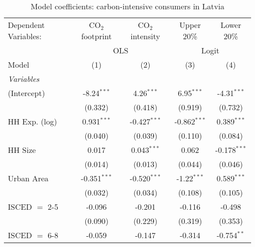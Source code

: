 
\begin{table}[htbp!]
   \centering
   \small
   \begin{adjustbox}{width = 1\textwidth, max height = 0.95\textheight, center}
      \begin{threeparttable}[b]
         \caption{\label{tab:Logit_1_LVA} Model coefficients: carbon-intensive consumers in Latvia}
         \begin{tabular}{lcccc}
            \tabularnewline \midrule \midrule
            Dependent Variables: & CO$_{2}$ footprint & CO$_{2}$ intensity & Upper 20\%     & Lower 20\%\\   
             & \multicolumn{2}{c}{OLS} & \multicolumn{2}{c}{Logit} \\ 
            Model                & (1)                & (2)                & (3)            & (4)\\  
            \midrule
            \emph{Variables}\\
            (Intercept)          & -8.24$^{***}$      & 4.26$^{***}$       & 6.95$^{***}$   & -4.31$^{***}$\\   
                                 & (0.332)            & (0.418)            & (0.919)        & (0.732)\\   
            HH Exp. (log)        & 0.931$^{***}$      & -0.427$^{***}$     & -0.862$^{***}$ & 0.389$^{***}$\\   
                                 & (0.040)            & (0.039)            & (0.110)        & (0.084)\\   
            HH Size              & 0.017              & 0.043$^{***}$      & 0.062          & -0.178$^{***}$\\   
                                 & (0.014)            & (0.013)            & (0.044)        & (0.046)\\   
            Urban Area           & -0.351$^{***}$     & -0.520$^{***}$     & -1.22$^{***}$  & 0.589$^{***}$\\   
                                 & (0.032)            & (0.034)            & (0.108)        & (0.105)\\   
            ISCED $=$ 2-5        & -0.096             & -0.201             & -0.116         & -0.498\\   
                                 & (0.090)            & (0.229)            & (0.319)        & (0.353)\\   
            ISCED $=$ 6-8        & -0.059             & -0.147             & -0.314         & -0.754$^{**}$\\   

\end{tabular}
\end{threeparttable}
\end{adjustbox}
\end{table}
